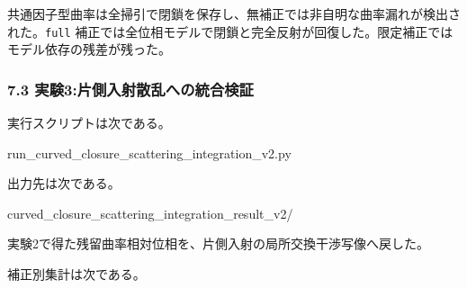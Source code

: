 \documentclass[
  a4paper,
]{article}
\newenvironment{Shaded}{}{}
\newcommand{\NormalTok}[1]{#1}
\begin{document}
共通因子型曲率は全掃引で閉鎖を保存し、無補正では非自明な曲率漏れが検出された。\texttt{full}
補正では全位相モデルで閉鎖と完全反射が回復した。限定補正ではモデル依存の残差が残った。

\subsubsection{7.3
実験3:片側入射散乱への統合検証}\label{ux5b9fux9a133ux7247ux5074ux5165ux5c04ux6563ux4e71ux3078ux306eux7d71ux5408ux691cux8a3c}

実行スクリプトは次である。

\begin{Shaded}
\begin{Highlighting}[]
\NormalTok{run\_curved\_closure\_scattering\_integration\_v2.py}
\end{Highlighting}
\end{Shaded}

出力先は次である。

\begin{Shaded}
\begin{Highlighting}[]
\NormalTok{curved\_closure\_scattering\_integration\_result\_v2/}
\end{Highlighting}
\end{Shaded}

実験2で得た残留曲率相対位相を、片側入射の局所交換干渉写像へ戻した。

補正別集計は次である。
\end{document}
